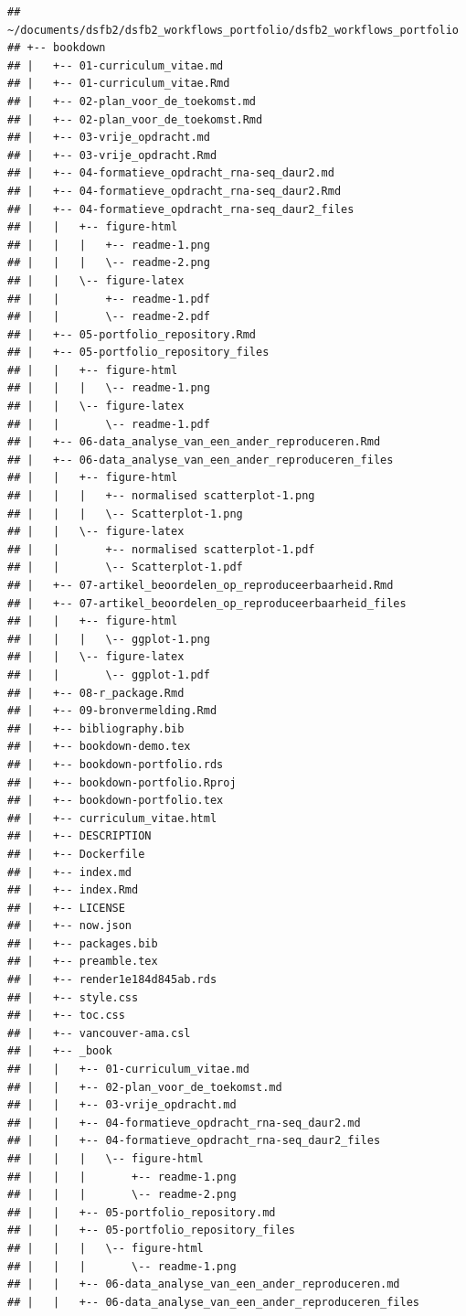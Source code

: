 \documentclass[
]{book}
\begin{document}
\begin{verbatim}
## ~/documents/dsfb2/dsfb2_workflows_portfolio/dsfb2_workflows_portfolio
## +-- bookdown
## |   +-- 01-curriculum_vitae.md
## |   +-- 01-curriculum_vitae.Rmd
## |   +-- 02-plan_voor_de_toekomst.md
## |   +-- 02-plan_voor_de_toekomst.Rmd
## |   +-- 03-vrije_opdracht.md
## |   +-- 03-vrije_opdracht.Rmd
## |   +-- 04-formatieve_opdracht_rna-seq_daur2.md
## |   +-- 04-formatieve_opdracht_rna-seq_daur2.Rmd
## |   +-- 04-formatieve_opdracht_rna-seq_daur2_files
## |   |   +-- figure-html
## |   |   |   +-- readme-1.png
## |   |   |   \-- readme-2.png
## |   |   \-- figure-latex
## |   |       +-- readme-1.pdf
## |   |       \-- readme-2.pdf
## |   +-- 05-portfolio_repository.Rmd
## |   +-- 05-portfolio_repository_files
## |   |   +-- figure-html
## |   |   |   \-- readme-1.png
## |   |   \-- figure-latex
## |   |       \-- readme-1.pdf
## |   +-- 06-data_analyse_van_een_ander_reproduceren.Rmd
## |   +-- 06-data_analyse_van_een_ander_reproduceren_files
## |   |   +-- figure-html
## |   |   |   +-- normalised scatterplot-1.png
## |   |   |   \-- Scatterplot-1.png
## |   |   \-- figure-latex
## |   |       +-- normalised scatterplot-1.pdf
## |   |       \-- Scatterplot-1.pdf
## |   +-- 07-artikel_beoordelen_op_reproduceerbaarheid.Rmd
## |   +-- 07-artikel_beoordelen_op_reproduceerbaarheid_files
## |   |   +-- figure-html
## |   |   |   \-- ggplot-1.png
## |   |   \-- figure-latex
## |   |       \-- ggplot-1.pdf
## |   +-- 08-r_package.Rmd
## |   +-- 09-bronvermelding.Rmd
## |   +-- bibliography.bib
## |   +-- bookdown-demo.tex
## |   +-- bookdown-portfolio.rds
## |   +-- bookdown-portfolio.Rproj
## |   +-- bookdown-portfolio.tex
## |   +-- curriculum_vitae.html
## |   +-- DESCRIPTION
## |   +-- Dockerfile
## |   +-- index.md
## |   +-- index.Rmd
## |   +-- LICENSE
## |   +-- now.json
## |   +-- packages.bib
## |   +-- preamble.tex
## |   +-- render1e184d845ab.rds
## |   +-- style.css
## |   +-- toc.css
## |   +-- vancouver-ama.csl
## |   +-- _book
## |   |   +-- 01-curriculum_vitae.md
## |   |   +-- 02-plan_voor_de_toekomst.md
## |   |   +-- 03-vrije_opdracht.md
## |   |   +-- 04-formatieve_opdracht_rna-seq_daur2.md
## |   |   +-- 04-formatieve_opdracht_rna-seq_daur2_files
## |   |   |   \-- figure-html
## |   |   |       +-- readme-1.png
## |   |   |       \-- readme-2.png
## |   |   +-- 05-portfolio_repository.md
## |   |   +-- 05-portfolio_repository_files
## |   |   |   \-- figure-html
## |   |   |       \-- readme-1.png
## |   |   +-- 06-data_analyse_van_een_ander_reproduceren.md
## |   |   +-- 06-data_analyse_van_een_ander_reproduceren_files

\end{verbatim}
\end{document}
